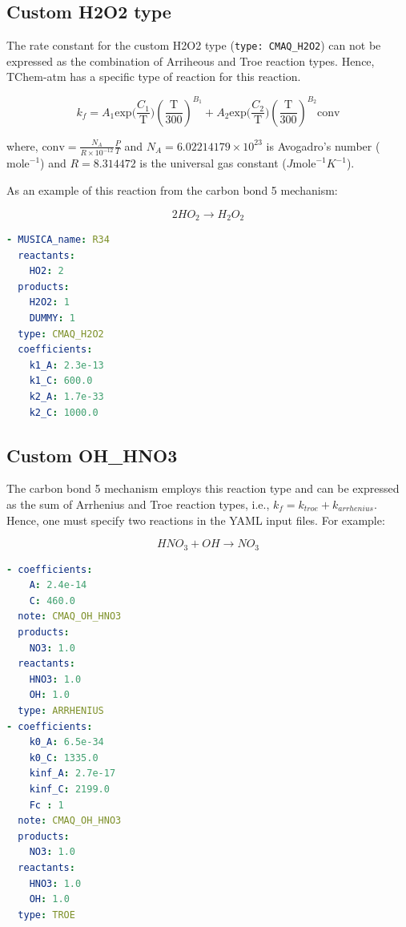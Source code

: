 \documentclass[report, 12pt]{SANDreport}
\begin{document}
\subsection{Custom H2O2 type}

The rate constant for the custom H2O2 type (\verb|type: CMAQ_H2O2|) can not be expressed as the combination of Arriheous and Troe reaction types. Hence, TChem-atm has a specific type of reaction for this reaction.

\begin{equation}
k_f = A_1 \mathrm{exp} \Big( \frac{C_1}{\mathrm{T}} \Big)
\left(\frac{\mathrm{T}}{300}\right)^{B_1} + A_2 \mathrm{exp} \Big ( \frac{C_2}{\mathrm{T}} \Big) \left(\frac{\mathrm{T}}{300}\right)^{B_2} \mathrm{conv}
\end{equation}

where, $\mathrm{conv} = \frac{N_A}{R \times 10^{-12}} \frac{P}{T}$ and $N_A=6.02214179 \times 10^{23}$ is Avogadro's number ($\mathrm{mole}^{-1}$) and $R=8.314472$ is the universal gas constant ($J \mathrm{mole}^{-1}K^{-1}$).

As an example of this reaction from the carbon bond 5 mechanism:

\begin{equation}
2HO_2 \rightarrow H_2O_2
\end{equation}

\begin{lstlisting}[language=yaml]
- MUSICA_name: R34
  reactants:
    HO2: 2
  products:
    H2O2: 1
    DUMMY: 1
  type: CMAQ_H2O2
  coefficients:
    k1_A: 2.3e-13
    k1_C: 600.0
    k2_A: 1.7e-33
    k2_C: 1000.0
\end{lstlisting}
\subsection{Custom OH\_HNO3}

The carbon bond 5 mechanism employs this reaction type and can be expressed as the sum of Arrhenius and Troe reaction types, i.e., $k_f=k_{troe} + k_{arrhenius}$. Hence, one must specify two reactions in the YAML input files. For example:

\begin{equation}
HNO_3 + OH \rightarrow NO_3
\end{equation}

\begin{lstlisting}[language=yaml]
- coefficients:
    A: 2.4e-14
    C: 460.0
  note: CMAQ_OH_HNO3
  products:
    NO3: 1.0
  reactants:
    HNO3: 1.0
    OH: 1.0
  type: ARRHENIUS
- coefficients:
    k0_A: 6.5e-34
    k0_C: 1335.0
    kinf_A: 2.7e-17
    kinf_C: 2199.0
    Fc : 1
  note: CMAQ_OH_HNO3
  products:
    NO3: 1.0
  reactants:
    HNO3: 1.0
    OH: 1.0
  type: TROE
\end{lstlisting}
\end{document}
